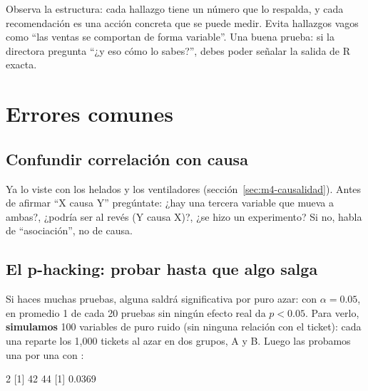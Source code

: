 \begin{consejo}
Observa la estructura: cada hallazgo tiene un número que lo respalda, y cada
recomendación es una acción concreta que se puede medir. Evita hallazgos
vagos como ``las ventas se comportan de forma variable''. Una buena prueba:
si la directora pregunta ``¿y eso cómo lo sabes?'', debes poder señalar la
salida de R exacta.
\end{consejo}

\section{Errores comunes}
\label{sec:m4-errores}

\subsection{Confundir correlación con causa}

Ya lo viste con los helados y los ventiladores
(sección~\ref{sec:m4-causalidad}). Antes de afirmar ``X causa Y'' pregúntate:
¿hay una tercera variable que mueva a ambas?, ¿podría ser al revés (Y causa
X)?, ¿se hizo un experimento? Si no, habla de ``asociación'', no de causa.

\subsection{El p-hacking: probar hasta que algo salga}

Si haces muchas pruebas, alguna saldrá significativa por puro azar: con
$\alpha = 0.05$, en promedio 1 de cada 20 pruebas sin ningún efecto real da
$p < 0.05$. Para verlo, \textbf{simulamos} 100 variables de puro ruido (sin
ninguna relación con el ticket): cada una reparte los 1,000 tickets al azar
en dos grupos, A y B. Luego las probamos una por una con :

\begin{rsalida}
[1] 2
[1] 42 44
[1] 0.0369
\end{rsalida}

